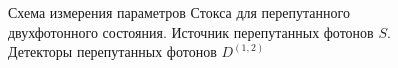 \begin{figure}
\centering


\caption{Схема измерения параметров Стокса для перепутанного
  двухфотонного состояния. Источник перепутанных фотонов $S$.
  Детекторы перепутанных фотонов $D^{(1,2)}$}
\label{figEntangMes}
\end{figure}
